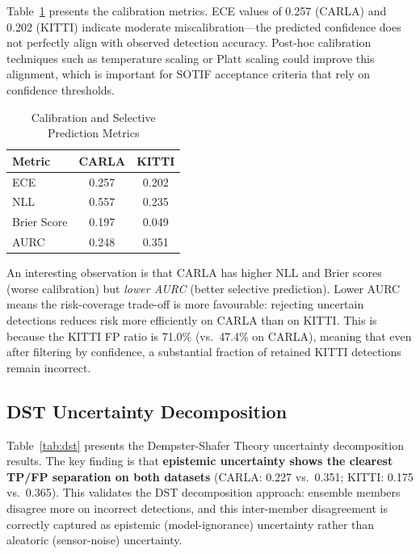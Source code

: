 \documentclass[conference]{IEEEtran}
\begin{document}
Table~\ref{tab:calibration} presents the calibration metrics. ECE values of 0.257 (CARLA) and 0.202 (KITTI) indicate moderate miscalibration---the predicted confidence does not perfectly align with observed detection accuracy. Post-hoc calibration techniques such as temperature scaling or Platt scaling could improve this alignment, which is important for SOTIF acceptance criteria that rely on confidence thresholds.

\begin{table}[t]
\caption{Calibration and Selective Prediction Metrics}
\label{tab:calibration}
\centering
\begin{tabular}{lcc}
\toprule
\textbf{Metric} & \textbf{CARLA} & \textbf{KITTI} \\
\midrule
ECE & 0.257 & 0.202 \\
NLL & 0.557 & 0.235 \\
Brier Score & 0.197 & 0.049 \\
AURC & 0.248 & 0.351 \\
\bottomrule
\end{tabular}
\end{table}

An interesting observation is that CARLA has higher NLL and Brier scores (worse calibration) but \emph{lower AURC} (better selective prediction). Lower AURC means the risk-coverage trade-off is more favourable: rejecting uncertain detections reduces risk more efficiently on CARLA than on KITTI. This is because the KITTI FP ratio is 71.0\% (vs.\ 47.4\% on CARLA), meaning that even after filtering by confidence, a substantial fraction of retained KITTI detections remain incorrect.

\subsection{DST Uncertainty Decomposition}

Table~\ref{tab:dst} presents the Dempster-Shafer Theory uncertainty decomposition results. The key finding is that \textbf{epistemic uncertainty shows the clearest TP/FP separation on both datasets} (CARLA: 0.227 vs.\ 0.351; KITTI: 0.175 vs.\ 0.365). This validates the DST decomposition approach: ensemble members disagree more on incorrect detections, and this inter-member disagreement is correctly captured as epistemic (model-ignorance) uncertainty rather than aleatoric (sensor-noise) uncertainty.
\end{document}
